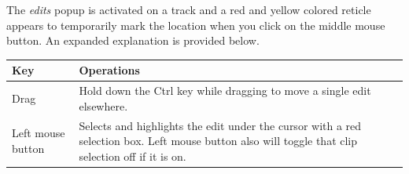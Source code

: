The \textit{edits} popup is activated on a track and a red and
yellow colored reticle appears to temporarily mark the location when
you click on the middle mouse button.  An expanded explanation is
provided below.

\renewcommand{\arraystretch}{1.15}
  \begin{longtable}{p{} p{}}
    \toprule
    \textbf{Key} & \textbf{Operations}\\
    \midrule
    Drag & Hold down the Ctrl key while dragging to move a single
           edit elsewhere.\\
    Left mouse button & Selects and highlights the edit under the
                        cursor with a red selection box. Left mouse
                        button also will toggle that clip selection
                        off if it is on.\\
    \bottomrule
  \end{longtable}

